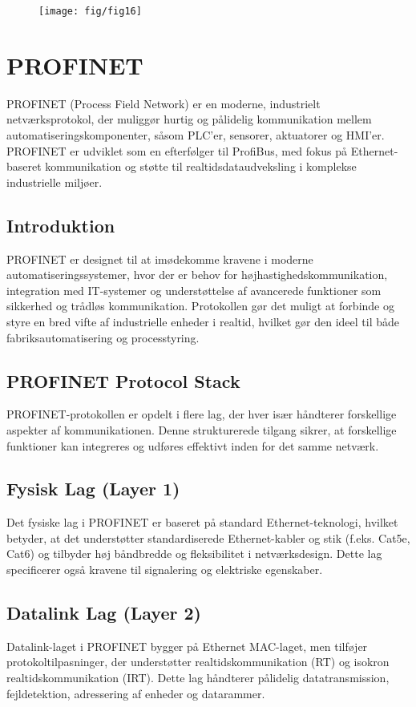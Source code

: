 \begin{figure}[!h]
	\centering
	\texttt{[image: fig/fig16]}
\end{figure}
\clearpage

\section{PROFINET}
PROFINET (Process Field Network) er en moderne, industrielt netværksprotokol, der muliggør hurtig og pålidelig kommunikation mellem automatiseringskomponenter, såsom PLC'er, sensorer, aktuatorer og HMI'er. PROFINET er udviklet som en efterfølger til ProfiBus, med fokus på Ethernet-baseret kommunikation og støtte til realtidsdataudveksling i komplekse industrielle miljøer.

\subsection{Introduktion}
PROFINET er designet til at imødekomme kravene i moderne automatiseringssystemer, hvor der er behov for højhastighedskommunikation, integration med IT-systemer og understøttelse af avancerede funktioner som sikkerhed og trådløs kommunikation. Protokollen gør det muligt at forbinde og styre en bred vifte af industrielle enheder i realtid, hvilket gør den ideel til både fabriksautomatisering og processtyring.

\subsection{PROFINET Protocol Stack}
PROFINET-protokollen er opdelt i flere lag, der hver især håndterer forskellige aspekter af kommunikationen. Denne strukturerede tilgang sikrer, at forskellige funktioner kan integreres og udføres effektivt inden for det samme netværk.

\subsection*{Fysisk Lag (Layer 1)}
Det fysiske lag i PROFINET er baseret på standard Ethernet-teknologi, hvilket betyder, at det understøtter standardiserede Ethernet-kabler og stik (f.eks. Cat5e, Cat6) og tilbyder høj båndbredde og fleksibilitet i netværksdesign. Dette lag specificerer også kravene til signalering og elektriske egenskaber.

\subsection*{Datalink Lag (Layer 2)}
Datalink-laget i PROFINET bygger på Ethernet MAC-laget, men tilføjer protokoltilpasninger, der understøtter realtidskommunikation (RT) og isokron realtidskommunikation (IRT). Dette lag håndterer pålidelig datatransmission, fejldetektion, adressering af enheder og datarammer.

